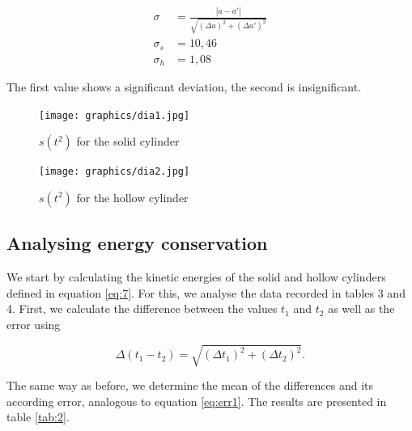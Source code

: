 \documentclass{article}
\begin{document}
\begin{equation}
    \begin{split}
        \sigma &= \frac{|a-a'|}{\sqrt{(\Delta a)^2 + (\Delta a')^2}} \\
        \sigma_s &= 10,46 \\
        \sigma_h &= 1,08
    \end{split}
    \label{sigma:a-a'}
\end{equation}

The first value shows a significant deviation, the second is insignificant.

\begin{figure} [p]
    \centering
    \texttt{[image: graphics/dia1.jpg]}
    \caption{$s(t^2)$ for the solid cylinder}
    \label{fig:solid}
\end{figure}

\begin{figure} [p]
    \centering
    \texttt{[image: graphics/dia2.jpg]}
    \caption{$s(t^2)$ for the hollow cylinder}
    \label{fig:hollow}
\end{figure}

\newpage

\subsection{Analysing energy conservation}

We start by calculating the kinetic energies of the solid and hollow cylinders defined in equation \ref{eq:7}. For this, we analyse the data recorded in tables 3 and 4. First, we calculate the difference between the values $t_1$ and $t_2$ as well as the error using

\begin{equation}
    \Delta (t_1 - t_2) = \sqrt{(\Delta t_1)^2 + (\Delta t_2)^2}.
\end{equation}

The same way as before, we determine the mean of the differences and its according error, analogous to equation \ref{eq:err1}. The results are presented in table \ref{tab:2}. 
\end{document}
